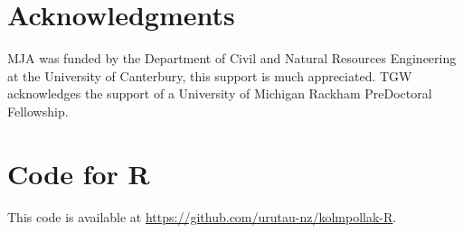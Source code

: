 \documentclass[final,3p,times,onecolumn,sort&compress]{elsarticle}
\begin{document}
\section{Acknowledgments}
MJA was funded by the Department of Civil and Natural Resources Engineering at the University of Canterbury, this support is much appreciated.
TGW acknowledges the support of a University of Michigan Rackham PreDoctoral Fellowship.



\clearpage
\newpage
\linenumbers
\appendix

\section{Code for R}
\label{app:r-code}
This code is available at \href{https://github.com/urutau-nz/kolmpollak-R}{https://github.com/urutau-nz/kolmpollak-R}.
\end{document}
